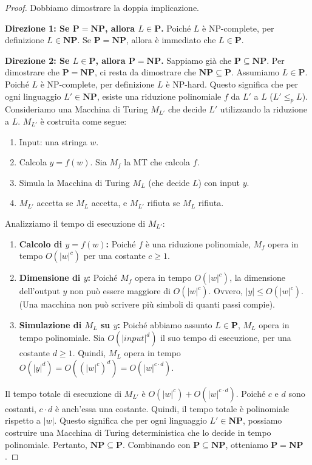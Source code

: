 \documentclass[a4paper, 11pt]{book} %
\theoremstyle{definition}
\begin{document}
\begin{proof}
Dobbiamo dimostrare la doppia implicazione.

\textbf{Direzione 1: Se $\mathbf{P} = \mathbf{NP}$, allora $L \in \mathbf{P}$.}
Poiché $L$ è NP-complete, per definizione $L \in \mathbf{NP}$. Se $\mathbf{P} = \mathbf{NP}$, allora è immediato che $L \in \mathbf{P}$.

\textbf{Direzione 2: Se $L \in \mathbf{P}$, allora $\mathbf{P} = \mathbf{NP}$.}
Sappiamo già che $\mathbf{P} \subseteq \mathbf{NP}$. Per dimostrare che $\mathbf{P} = \mathbf{NP}$, ci resta da dimostrare che $\mathbf{NP} \subseteq \mathbf{P}$.
Assumiamo $L \in \mathbf{P}$.
Poiché $L$ è NP-complete, per definizione $L$ è NP-hard.
Questo significa che per ogni linguaggio $L' \in \mathbf{NP}$, esiste una riduzione polinomiale $f$ da $L'$ a $L$ ($L' \le_p L$).
Consideriamo una Macchina di Turing $M_{L'}$ che decide $L'$ utilizzando la riduzione a $L$. $M_{L'}$ è costruita come segue:
\begin{enumerate}
    \item Input: una stringa $w$.
    \item Calcola $y = f(w)$. Sia $M_f$ la MT che calcola $f$.
    \item Simula la Macchina di Turing $M_L$ (che decide $L$) con input $y$.
    \item $M_{L'}$ accetta se $M_L$ accetta, e $M_{L'}$ rifiuta se $M_L$ rifiuta.
\end{enumerate}

Analizziamo il tempo di esecuzione di $M_{L'}$:
\begin{enumerate}
    \item \textbf{Calcolo di $y = f(w)$:} Poiché $f$ è una riduzione polinomiale, $M_f$ opera in tempo $O(|w|^c)$ per una costante $c \ge 1$.
    \item \textbf{Dimensione di $y$:} Poiché $M_f$ opera in tempo $O(|w|^c)$, la dimensione dell'output $y$ non può essere maggiore di $O(|w|^c)$. Ovvero, $|y| \le O(|w|^c)$. (Una macchina non può scrivere più simboli di quanti passi compie).
    \item \textbf{Simulazione di $M_L$ su $y$:} Poiché abbiamo assunto $L \in \mathbf{P}$, $M_L$ opera in tempo polinomiale. Sia $O(|input|^d)$ il suo tempo di esecuzione, per una costante $d \ge 1$.
    Quindi, $M_L$ opera in tempo $O(|y|^d) = O((|w|^c)^d) = O(|w|^{c \cdot d})$.
\end{enumerate}
Il tempo totale di esecuzione di $M_{L'}$ è $O(|w|^c) + O(|w|^{c \cdot d})$. Poiché $c$ e $d$ sono costanti, $c \cdot d$ è anch'essa una costante. Quindi, il tempo totale è polinomiale rispetto a $|w|$.
Questo significa che per ogni linguaggio $L' \in \mathbf{NP}$, possiamo costruire una Macchina di Turing deterministica che lo decide in tempo polinomiale.
Pertanto, $\mathbf{NP} \subseteq \mathbf{P}$.
Combinando con $\mathbf{P} \subseteq \mathbf{NP}$, otteniamo $\mathbf{P} = \mathbf{NP}$.
\end{proof}
\end{document}

